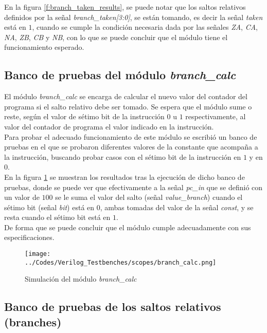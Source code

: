 En la figura \ref{f:branch_taken_results}, se puede notar que los saltos relativos definidos por la se\~nal \textit{branch\_taken[3:0]}, se est\'an tomando, es decir la se\~nal \textit{taken} est\'a en $1$, cuando se cumple la condici\'on necesaria dada por las se\~nales \textit{ZA}, \textit{CA}, \textit{NA}, \textit{ZB}, \textit{CB} y \textit{NB}, con lo que se puede concluir que el m\'odulo tiene el funcionamiento esperado.\\

\subsection{Banco de pruebas del m\' odulo \textit{branch\_calc}}
El m\'odulo \textit{branch\_calc} se encarga de calcular el nuevo valor del contador del programa si el salto relativo debe ser tomado. Se espera que el m\'odulo sume o reste, seg\'un el valor de s\'etimo bit de la instrucci\'on $0$ u $1$ respectivamente, al valor del contador de programa el valor indicado en la instrucci\'on.\\

Para probar el adecuado funcionamiento de este m\'odulo se escribi\'o un banco de pruebas en el que se probaron diferentes valores de la constante que acompa\~na a la instrucci\'on, buscando probar casos con el s\'etimo bit de la instrucci\'on en $1$ y en $0$.\\

En la figura \ref{f:branch_calc_results} se muestran los resultados tras la ejecuci\'on de dicho banco de pruebas, donde se puede ver que efectivamente a la se\~nal \textit{pc\_in} que se defini\'o con un valor de $100$ se le suma el valor del salto (se\~nal \textit{value\_branch}) cuando el s\'etimo bit (se\~nal \textit{bit}) est\'a en $0$, ambas tomadas del valor de la se\~nal \textit{const}, y se resta cuando el s\'etimo bit est\'a en $1$.\\

De forma que se puede concluir que el m\'odulo cumple adecuadamente con sus especificaciones.\\

\begin{figure}[hbtp]
\caption{Simulaci\' on del m\'odulo \textit{branch\_calc}}
\centering
\texttt{[image: ../Codes/Verilog\_Testbenches/scopes/branch\_calc.png]}
\label{f:branch_calc_results}
\end{figure}

\subsection{Banco de pruebas de los saltos relativos (branches)}

